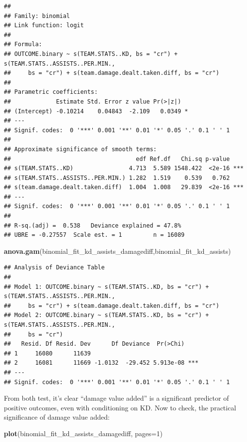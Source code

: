 \documentclass[
]{article}
\newenvironment{Shaded}{\begin{snugshade}}{\end{snugshade}}
\newcommand{\AttributeTok}[1]{\textcolor[rgb]{0.13,0.29,0.53}{#1}}
\newcommand{\DecValTok}[1]{\textcolor[rgb]{0.00,0.00,0.81}{#1}}
\newcommand{\FunctionTok}[1]{\textcolor[rgb]{0.13,0.29,0.53}{\textbf{#1}}}
\newcommand{\NormalTok}[1]{#1}
\begin{document}
\begin{verbatim}
## 
## Family: binomial 
## Link function: logit 
## 
## Formula:
## OUTCOME.binary ~ s(TEAM.STATS..KD, bs = "cr") + s(TEAM.STATS..ASSISTS..PER.MIN., 
##     bs = "cr") + s(team.damage.dealt.taken.diff, bs = "cr")
## 
## Parametric coefficients:
##             Estimate Std. Error z value Pr(>|z|)  
## (Intercept) -0.10214    0.04843  -2.109   0.0349 *
## ---
## Signif. codes:  0 '***' 0.001 '**' 0.01 '*' 0.05 '.' 0.1 ' ' 1
## 
## Approximate significance of smooth terms:
##                                    edf Ref.df   Chi.sq p-value    
## s(TEAM.STATS..KD)                4.713  5.589 1548.422  <2e-16 ***
## s(TEAM.STATS..ASSISTS..PER.MIN.) 1.282  1.519    0.539   0.762    
## s(team.damage.dealt.taken.diff)  1.004  1.008   29.839  <2e-16 ***
## ---
## Signif. codes:  0 '***' 0.001 '**' 0.01 '*' 0.05 '.' 0.1 ' ' 1
## 
## R-sq.(adj) =  0.538   Deviance explained = 47.8%
## UBRE = -0.27557  Scale est. = 1         n = 16089
\end{verbatim}

\begin{Shaded}
\begin{Highlighting}[]
\FunctionTok{anova.gam}\NormalTok{(binomial\_fit\_kd\_assists\_damagediff,binomial\_fit\_kd\_assists)}
\end{Highlighting}
\end{Shaded}

\begin{verbatim}
## Analysis of Deviance Table
## 
## Model 1: OUTCOME.binary ~ s(TEAM.STATS..KD, bs = "cr") + s(TEAM.STATS..ASSISTS..PER.MIN., 
##     bs = "cr") + s(team.damage.dealt.taken.diff, bs = "cr")
## Model 2: OUTCOME.binary ~ s(TEAM.STATS..KD, bs = "cr") + s(TEAM.STATS..ASSISTS..PER.MIN., 
##     bs = "cr")
##   Resid. Df Resid. Dev      Df Deviance  Pr(>Chi)    
## 1     16080      11639                               
## 2     16081      11669 -1.0132  -29.452 5.913e-08 ***
## ---
## Signif. codes:  0 '***' 0.001 '**' 0.01 '*' 0.05 '.' 0.1 ' ' 1
\end{verbatim}

From both test, it's clear ``damage value added'' is a significant
predictor of positive outcomes, even with conditioning on KD. Now to
check, the practical significance of damage value added:

\begin{Shaded}
\begin{Highlighting}[]
\FunctionTok{plot}\NormalTok{(binomial\_fit\_kd\_assists\_damagediff, }\AttributeTok{pages=}\DecValTok{1}\NormalTok{)}
\end{Highlighting}
\end{Shaded}
\end{document}
